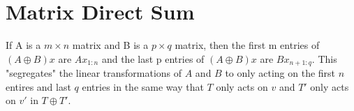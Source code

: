 \section{Matrix Direct Sum}

If A is a $m \times n$ matrix and B is a $p \times q$ matrix,
then the first m entries of $(A \oplus B)x$ are $Ax_{1:n}$ 
and the last p entries of $(A \oplus B)x$ are $Bx_{n+1:q}$. 
This "segregates" the linear transformations of $A$ and $B$
to only acting on the first $n$ entires and last $q$ entries
in the same way that $T$ only acts on $v$ and $T'$ only acts on $v'$
in $T \oplus T'$.
